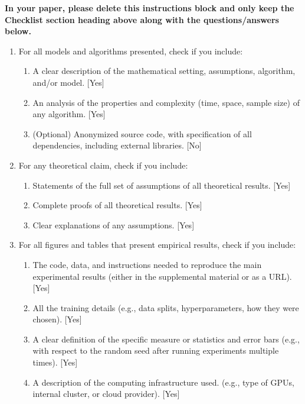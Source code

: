 \documentclass[twoside]{article}
\theoremstyle{plain}
\theoremstyle{definition}
\theoremstyle{plain}
\begin{document}
\textbf{In your paper, please delete this instructions block and only keep the Checklist section heading above along with the questions/answers below.}
\fi

\begin{enumerate}

  \item For all models and algorithms presented, check if you include:
  \begin{enumerate}
    \item A clear description of the mathematical setting, assumptions, algorithm, and/or model. [Yes]
    \item An analysis of the properties and complexity (time, space, sample size) of any algorithm. [Yes]
    \item (Optional) Anonymized source code, with specification of all dependencies, including external libraries. [No]
  \end{enumerate}

  \item For any theoretical claim, check if you include:
  \begin{enumerate}
    \item Statements of the full set of assumptions of all theoretical results. [Yes]
    \item Complete proofs of all theoretical results. [Yes]
    \item Clear explanations of any assumptions. [Yes]     
  \end{enumerate}

  \item For all figures and tables that present empirical results, check if you include:
  \begin{enumerate}
    \item The code, data, and instructions needed to reproduce the main experimental results (either in the supplemental material or as a URL). [Yes]
    \item All the training details (e.g., data splits, hyperparameters, how they were chosen). [Yes]
    \item A clear definition of the specific measure or statistics and error bars (e.g., with respect to the random seed after running experiments multiple times). [Yes]
    \item A description of the computing infrastructure used. (e.g., type of GPUs, internal cluster, or cloud provider). [Yes]
  \end{enumerate}


\end{enumerate}
\end{document}
